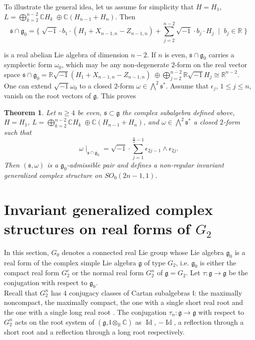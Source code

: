 \documentclass[10pt]{article}
\newtheorem{theorem}{Theorem}[section]
\begin{document}
To illustrate the general idea, let us assume for simplicity that $H=H_1$, $L=\bigoplus\limits_{k=2}^{n-2}\mathbb C H_k \; \oplus \mathbb C (H_{n-1}+H_n)$. Then 
$$
\mathfrak{s}\cap \mathfrak{g}_0 = \{\; \sqrt{-1}\cdot b_1 \cdot (H_1+X_{n-1,n}-Z_{n-1,n}) + \sum\limits_{j=2}^{n-2} \sqrt{-1}\cdot b_j \cdot H_j \; \mid \; b_j\in \mathbb R \;\}
$$

is a real abelian Lie algebra of dimension $n-2$. If $n$ is even, $\mathfrak{s}\cap \mathfrak{g}_0$ carries a symplectic form ${\omega}_0$, which may be any non-degenerate $2$-form on the real vector space $\mathfrak{s}\cap \mathfrak{g}_0=\mathbb R \sqrt{-1} (H_1+X_{n-1,n}-Z_{n-1,n})\;\oplus \bigoplus\limits_{j=2}^{n-2}\mathbb R \sqrt{-1}H_j\cong \mathbb R ^{n-2}$. One can extend $\sqrt{-1}{\omega}_0$ to a closed $2$-form $\omega \in \bigwedge ^2 {\mathfrak{s}}^{*}$. Assume that ${\epsilon}_j$, $1\leq j \leq n$, vanish on the root vectors of $\mathfrak{g}$. This proves

\begin{theorem}\label{theorem:22}
Let $n\geq 4$ be even, $\mathfrak{s}\subset \mathfrak{g}$ the complex subalgebra defined above, $H=H_1$, $L=\bigoplus\limits_{k=2}^{n-2}\mathbb C H_k \; \oplus \mathbb C (H_{n-1}+H_n)$, and $\omega \in \bigwedge ^2 {\mathfrak{s}}^{*}$ a closed $2$-form such that
$$
\omega \mid_{\mathfrak{s}\cap \mathfrak{g}_0}=\sqrt{-1}\cdot \sum\limits_{j=1}^{\frac{n}{2}-1} {\epsilon}_{2j-1}\wedge {\epsilon}_{2j}.
$$
Then $(\mathfrak{s},\omega)$ is a $\mathfrak{g}_0$-admissible pair and defines a non-regular invariant generalized complex structure on $SO_0(2n-1,1)$. 
\end{theorem}



\section{Invariant generalized complex structures on real forms of $G_2$}

In this section, $G_0$ denotes a connected real Lie group whose Lie algebra $\mathfrak{g}_0$ is a real form of the complex simple Lie algebra $\mathfrak{g}$ of type $G_2$, i.e. $\mathfrak{g}_0$ is either the compact real form $G_2^c$ or the normal real form $G_2^n$ of $\mathfrak{g}=G_2$. Let $\tau\colon \mathfrak{g}\to \mathfrak{g}$ be the conjugation with respect to $\mathfrak{g}_0$.\\

Recall that $G_2^n$ has $4$ conjugacy classes of Cartan subalgebras $\mathfrak{l}$: the maximally noncompact, the maximally compact, the one with a single short real root and the one with a single long real root \cite{Sugiura}. The conjugation ${\tau}_n \colon \mathfrak{g}\to \mathfrak{g}$ with respect to $G_2^n$ acts on the root system of $(\mathfrak{g},\mathfrak{l}\otimes_{\mathbb R}\mathbb C)$ as $\operatorname{Id}$, $-\operatorname{Id}$, a reflection through a short root and a reflection through a long root respectively.\\
\end{document}
